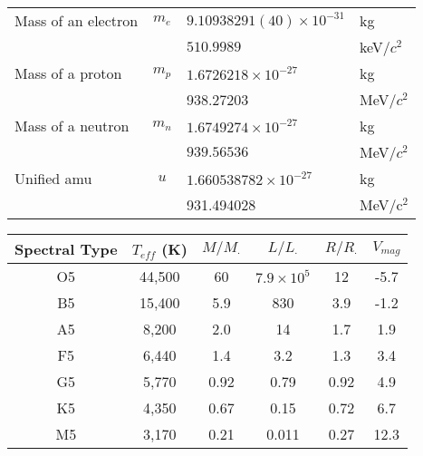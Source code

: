 \begin{fancybox}{}
\begin{center}
\begin{tabular}{   l  |  c  |  l  |  l  }
		Mass of an electron & $m_e$ & $9.10938291(40)\times 10^{-31}$ & kg\\
		&  & $510.9989$ & keV/$c^2$\\
		Mass of a proton& $m_p$ & $1.6726218 \times 10^{-27}$ & kg\\
		&  & 938.27203 & MeV/$c^2$\\
		Mass of a neutron& $m_n$   & $1.6749274 \times 10^{-27}$ & kg \\
		& & $939.56536$ & MeV/$c^2$	\\
		Unified amu & $u$ &  $1.660538782\times 10^{-27}$ & kg \\
		  &   &  931.494028 & MeV/c$^2$ 
	\end{tabular}
\end{center}
\end{fancybox}

\begin{fancybox}{}
	\begin{center}
		\begin{tabular}{c|c|c|c|c|c}
			Spectral Type & $T_{eff}$ (K) & $M/M_\cdot$ & $L/L_\cdot$ & $R/R_\cdot$ & $V_{mag}$ \\
			\hline
			O5 & 44,500 & 60 & $7.9\times 10^5$ & 12 &-5.7 \\
			B5 & 15,400 & 5.9 & 830 & 3.9 & -1.2 \\
			A5 & 8,200 & 2.0 & 14 & 1.7 & 1.9 \\
			F5 & 6,440 & 1.4 & 3.2 & 1.3 & 3.4 \\
			G5 & 5,770 & 0.92 & 0.79 & 0.92 & 4.9 \\
			K5 & 4,350 & 0.67 & 0.15 & 0.72 & 6.7 \\
			M5 & 3,170 & 0.21 & 0.011 & 0.27 & 12.3 \\
		\end{tabular}
	\end{center}
\end{fancybox}



